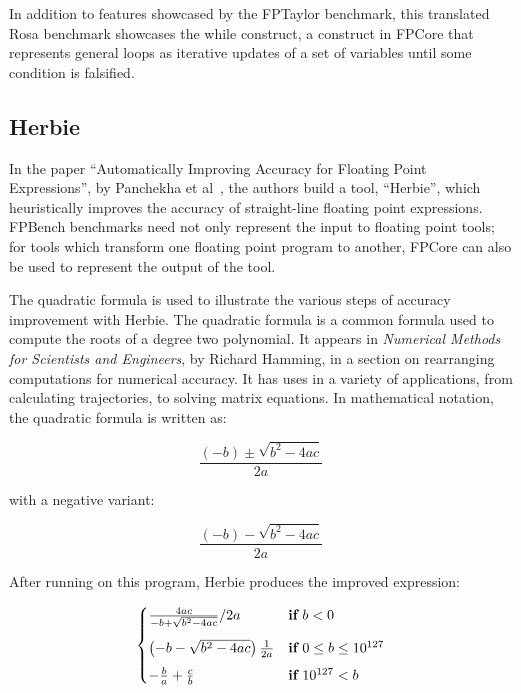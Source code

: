 \documentclass[main.tex]{subfiles}
\begin{document}
In addition to features showcased by the FPTaylor benchmark, this
translated Rosa benchmark showcases the while construct, a construct
in FPCore that represents general loops as iterative updates of a set
of variables until some condition is falsified.

\subsection{Herbie}

In the paper ``Automatically Improving Accuracy for Floating Point
Expressions'', by Panchekha et al~\cite{pavel15}, the authors build a
tool, ``Herbie'', which heuristically improves the accuracy of
straight-line floating point expressions. FPBench benchmarks need not
only represent the input to floating point tools; for tools which
transform one floating point program to another, FPCore can also be
used to represent the output of the tool.

The quadratic formula is used to illustrate the various steps of
accuracy improvement with Herbie. The quadratic formula is a common
formula used to compute the roots of a degree two polynomial. It
appears in \textit{Numerical Methods for Scientists and Engineers}, by
Richard Hamming, in a section on rearranging computations for
numerical accuracy. It has uses in a variety of applications, from
calculating trajectories, to solving matrix equations. In mathematical
notation, the quadratic formula is written as:

\begin{equation}
  \frac{(- b) \pm \sqrt{b^2 - 4ac}}{2a}
\end{equation}

with a negative variant:

\begin{equation}
  \frac{(- b) - \sqrt{b^2 - 4ac}}{2a}
\end{equation}

After running on this program, Herbie produces the improved
expression:

\newcommand{\K}[1]{\ensuremath{\mathbf{#1}}\relax\ifmmode\:\else\fi}

\[
\begin{cases}
  \frac{4ac}{-b + \sqrt{b^2 - 4ac}}/2a & \K{if} b < 0 \\[9pt]
  \left(-b - \sqrt{b^2 - 4ac}\right)\frac1{2a} & \K{if} 0 \le b \le 10^{127} \\[5pt]
  -\frac{b}{a} + \frac{c}{b} & \K{if} 10^{127} < b
\end{cases}
\]
\end{document}
